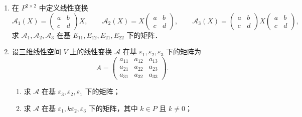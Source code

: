 \begin{enumerate}
\begin{enumerate}
    \[
      \begin{cases}
        \mathcal{A}\eta_1=(-5,0,3),\\
        \mathcal{A}\eta_2=(0,-1,6),\\
        \mathcal{A}\eta_3=(-5,-1,9),
      \end{cases}
      \quad\text{其中}\quad
      \begin{cases}
        \eta_1=(-1,0,2),\\
        \eta_2=(0,1,1),\\
        \eta_3=(3,-1,0),
      \end{cases}
    \]
    求 $\mathcal{A}$ 在基 $\varepsilon_1=(1,0,0)$，$\varepsilon_2=(0,1,0)$，$\varepsilon_3=(0,0,1)$ 下的矩阵；
  \anssub
    \item 同上，求 $\mathcal{A}$ 在 $\eta_1,\eta_2,\eta_3$ 下的矩阵．
  \anssub
  \end{enumerate}
  \item 在 $P^{2\times 2}$ 中定义线性变换
  \[
    \mathcal{A}_1(X)=\begin{pmatrix}a&b\\c&d\end{pmatrix}X,\qquad
    \mathcal{A}_2(X)=X\begin{pmatrix}a&b\\c&d\end{pmatrix},\qquad
    \mathcal{A}_3(X)=\begin{pmatrix}a&b\\c&d\end{pmatrix}X\begin{pmatrix}a&b\\c&d\end{pmatrix},
  \]
  求 $\mathcal{A}_1,\mathcal{A}_2,\mathcal{A}_3$ 在基 $E_{11},E_{12},E_{21},E_{22}$ 下的矩阵．
  \anscompute
  \item 设三维线性空间 $V$ 上的线性变换 $\mathcal{A}$ 在基 $\varepsilon_1,\varepsilon_2,\varepsilon_3$ 下的矩阵为
  \[
    A=\begin{pmatrix}
      a_{11}&a_{12}&a_{13}\\
      a_{21}&a_{22}&a_{23}\\
      a_{31}&a_{32}&a_{33}
    \end{pmatrix}.
  \]
  \begin{enumerate}
    \item 求 $\mathcal{A}$ 在基 $\varepsilon_3,\varepsilon_2,\varepsilon_1$ 下的矩阵；
  \anssub
    \item 求 $\mathcal{A}$ 在基 $\varepsilon_1,k\varepsilon_2,\varepsilon_3$ 下的矩阵，其中 $k\in P$ 且 $k\ne 0$；

\end{enumerate}
\end{enumerate}
